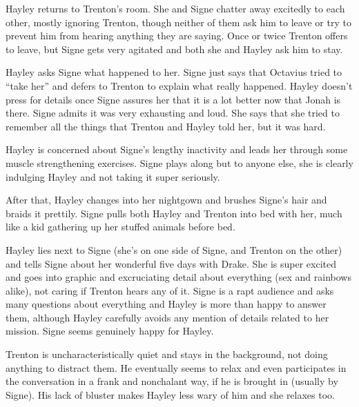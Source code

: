 Hayley returns to Trenton's room.  She and Signe chatter away excitedly to each other, mostly ignoring Trenton, though neither of them ask him to leave or try to prevent him from hearing anything they are saying.  Once or twice Trenton offers to leave, but Signe gets very agitated and both she and Hayley ask him to stay.  



Hayley asks Signe what happened to her.  Signe just says that Octavius tried to ``take her'' and defers to Trenton to explain what really happened.  Hayley doesn't press for details once Signe assures her that it is a lot better now that Jonah is there.  Signe admits it was very exhausting and loud.  She says that she tried to remember all the things that Trenton and Hayley told her, but it was hard.



Hayley is concerned about Signe's lengthy inactivity and leads her through some muscle strengthening exercises.  Signe plays along but to anyone else, she is clearly indulging Hayley and not taking it super seriously.



After that, Hayley changes into her nightgown and brushes Signe's hair and braids it prettily.  Signe pulls both Hayley and Trenton into bed with her, much like a kid gathering up her stuffed animals before bed.



Hayley lies next to Signe (she's on one side of Signe, and Trenton on the other) and tells Signe about her wonderful five days with Drake.  She is super excited and goes into graphic and excruciating detail about everything (sex and rainbows alike), not caring if Trenton hears any of it.  Signe is a rapt audience and asks many questions about everything and Hayley is more than happy to answer them, although Hayley carefully avoids any mention of details related to her mission.  Signe seems genuinely happy for Hayley.



Trenton is uncharacteristically quiet and stays in the background, not doing anything to distract them.  He eventually seems to relax and even participates in the conversation in a frank and nonchalant way, if he is brought in (usually by Signe).   His lack of bluster makes Hayley less wary of him and she relaxes too.



